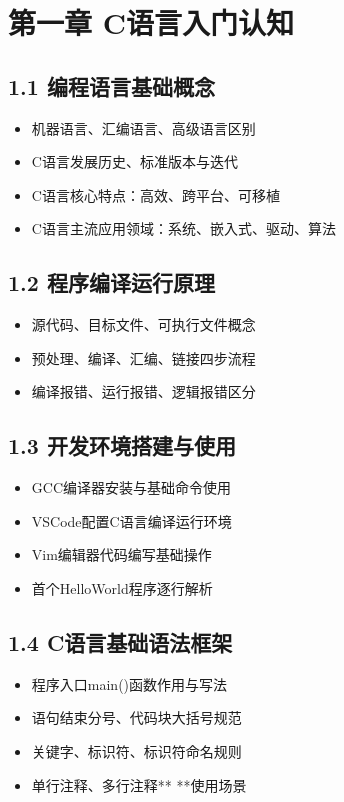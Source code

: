 
\section{第一章 C语言入门认知}
\subsection{1.1 编程语言基础概念}
\begin{itemize}
\item 机器语言、汇编语言、高级语言区别
\item C语言发展历史、标准版本与迭代
\item C语言核心特点：高效、跨平台、可移植
\item C语言主流应用领域：系统、嵌入式、驱动、算法
\end{itemize}

\subsection{1.2 程序编译运行原理}
\begin{itemize}
\item 源代码、目标文件、可执行文件概念
\item 预处理、编译、汇编、链接四步流程
\item 编译报错、运行报错、逻辑报错区分
\end{itemize}

\subsection{1.3 开发环境搭建与使用}
\begin{itemize}
\item GCC编译器安装与基础命令使用
\item VSCode配置C语言编译运行环境
\item Vim编辑器代码编写基础操作
\item 首个HelloWorld程序逐行解析
\end{itemize}

\subsection{1.4 C语言基础语法框架}
\begin{itemize}
\item 程序入口main()函数作用与写法
\item 语句结束分号、代码块大括号规范
\item 关键字、标识符、标识符命名规则
\item 单行注释\/\/、多行注释\/** **\/使用场景
\end{itemize}

